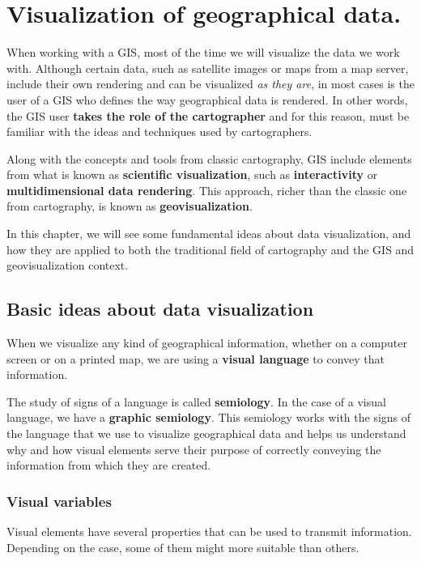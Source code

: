\chapter{Visualization of geographical data.}


\pagestyle{fancy}

When working with a GIS, most of the time we will visualize the data we work with. Although certain data, such as satellite images or maps from a map server, include their own rendering and can be visualized \emph{as they are}, in most cases is the user of a GIS who defines the way geographical data is rendered. In other words, the GIS user \textbf{takes the role of the cartographer} and for this reason, must be familiar with the ideas and techniques used by cartographers.

Along with the concepts and tools from classic cartography, GIS include elements from what is known as \textbf{scientific visualization}, such as \textbf{interactivity} or \textbf{multidimensional data rendering}. This approach, richer than the classic one from cartography, is known as \textbf{geovisualization}.

In this chapter, we will see some fundamental ideas about data visualization, and how they are applied to both the traditional field of cartography and the GIS and geovisualization context.

\section{Basic ideas about data visualization}

When we visualize any kind of geographical information, whether on a computer screen or on a printed map, we are using a \textbf{visual language} to convey that information. 

The study of signs of a language is called \textbf{semiology}. In the case of a visual language, we have a \textbf{graphic semiology}. This semiology works with the signs of the language that we use to visualize geographical data and helps us understand why and how visual elements serve their purpose of correctly conveying the information from which they are created.

\subsection{Visual variables}

Visual elements have several properties that can be used to transmit information. Depending on the case, some of them might more suitable than others.


